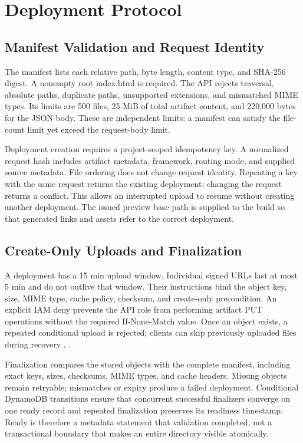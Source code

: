 \documentclass[conference,letterpaper]{IEEEtran}
\begin{document}
\section{Deployment Protocol}
\subsection{Manifest Validation and Request Identity}
The manifest lists each relative path, byte length, content type, and SHA-256 digest. A nonempty root index.html is required. The API rejects traversal, absolute paths, duplicate paths, unsupported extensions, and mismatched MIME types. Its limits are 500 files, 25 MiB of total artifact content, and 220,000 bytes for the JSON body. These are independent limits: a manifest can satisfy the file-count limit yet exceed the request-body limit.

Deployment creation requires a project-scoped idempotency key. A normalized request hash includes artifact metadata, framework, routing mode, and supplied source metadata. File ordering does not change request identity. Repeating a key with the same request returns the existing deployment; changing the request returns a conflict. This allows an interrupted upload to resume without creating another deployment. The issued preview base path is supplied to the build so that generated links and assets refer to the correct deployment.

\subsection{Create-Only Uploads and Finalization}
A deployment has a 15 min upload window. Individual signed URLs last at most 5 min and do not outlive that window. Their instructions bind the object key, size, MIME type, cache policy, checksum, and create-only precondition. An explicit IAM deny prevents the API role from performing artifact PUT operations without the required If-None-Match value. Once an object exists, a repeated conditional upload is rejected; clients can skip previously uploaded files during recovery \cite{r1}, \cite{r4}.

Finalization compares the stored objects with the complete manifest, including exact keys, sizes, checksums, MIME types, and cache headers. Missing objects remain retryable; mismatches or expiry produce a failed deployment. Conditional DynamoDB transitions ensure that concurrent successful finalizers converge on one ready record and repeated finalization preserves its readiness timestamp. Ready is therefore a metadata statement that validation completed, not a transactional boundary that makes an entire directory visible atomically.
\end{document}
